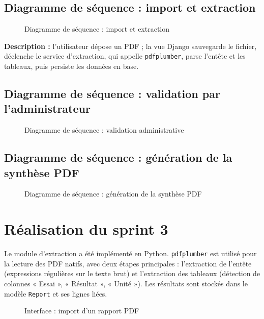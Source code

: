 \subsection{Diagramme de séquence : import et extraction}
\begin{figure}[h!]
\centering
{}
\caption{Diagramme de séquence : import et extraction}
\end{figure}

\textbf{Description :} l'utilisateur dépose un PDF ; la vue Django sauvegarde le
fichier, déclenche le service d'extraction, qui appelle \texttt{pdfplumber}, parse
l'entête et les tableaux, puis persiste les données en base.

\subsection{Diagramme de séquence : validation par l'administrateur}
\begin{figure}[h!]
\centering
{}
\caption{Diagramme de séquence : validation administrative}
\end{figure}

\subsection{Diagramme de séquence : génération de la synthèse PDF}
\begin{figure}[h!]
\centering
{}
\caption{Diagramme de séquence : génération de la synthèse PDF}
\end{figure}

\section{Réalisation du sprint 3}
Le module d'extraction a été implémenté en Python. \texttt{pdfplumber} est utilisé
pour la lecture des PDF natifs, avec deux étapes principales : l'extraction de
l'entête (expressions régulières sur le texte brut) et l'extraction des tableaux
(détection de colonnes « Essai », « Résultat », « Unité »). Les résultats sont
stockés dans le modèle \texttt{Report} et ses lignes liées.

\begin{figure}[h!]
\centering
{}
\caption{Interface : import d'un rapport PDF}
\end{figure}

